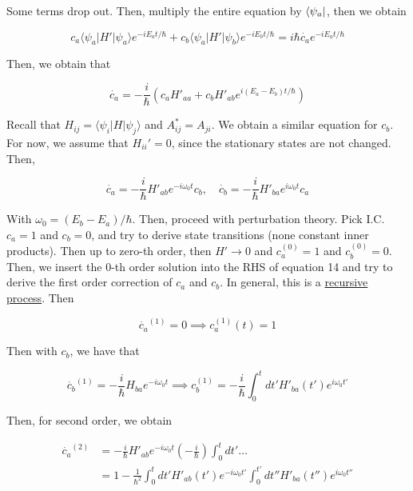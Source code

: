 \documentclass{article}
\newtheorem{one minute paper}[theorem]{One Minute Paper}
\begin{document}
Some terms drop out. Then, multiply the entire equation by $\bra{\psi_a}$, then we obtain 

\begin{equation}
    c_a \langle \psi_a|H'|\psi_a \rangle e^{-iE_at/\hbar} + c_b\langle \psi_a | H' | \psi_b \rangle e^{-iE_bt/\hbar} = i\hbar \dot{c_a}e^{-iE_at/\hbar}
\end{equation}

Then, we obtain that 

\begin{equation}
    \dot{c_a} = -\frac{i}{\hbar}\left( c_a H'_{aa} + c_b H'_{ab}e^{i(E_a - E_b)t/\hbar}\right)
\end{equation}

Recall that $H_{ij} = \langle \psi_i | H | \psi_j \rangle$ and $A^{*}_{ij} = A_{ji}$. We obtain a similar equation for $c_b$. For now, we assume that $H_{ii}' = 0$, since the stationary states are not changed. Then, 

\begin{equation}
    \dot{c_a} = -\frac{i}{\hbar}H'_{ab}e^{-i\omega_0 t}c_b, \quad \dot{c_b} = -\frac{i}{\hbar}H'_{ba}e^{i\omega_0 t}c_a
\end{equation}

With $\omega_0 = (E_b - E_a)/\hbar$. Then, proceed with perturbation theory. Pick I.C. $c_a = 1$ and $c_b = 0$, and try to derive state transitions (none constant inner products). Then up to zero-th order, then 
$H' \rightarrow 0$ and $c_a^{(0)} = 1$ and $c_b^{(0)} = 0$. Then, we insert the 0-th order solution into the RHS of equation 14 and try to derive the first order correction of $c_a$ and $c_b$. In general, this is a \underline{recursive process}. Then 

\begin{equation}
    \dot{c_a}^{(1)} = 0 \implies c_a^{(1)}(t) =1
\end{equation}

Then with $c_b$, we have that 

\begin{equation}
    \dot{c_b}^{(1)} = -\frac{i}{\hbar}H_{ba}e^{-i\omega_0 t} \implies c_b^{(1)} = -\frac{i}{\hbar} \int_{0}^{t}dt'H'_{ba}(t')e^{i\omega_0 t'}
\end{equation}

Then, for second order, we obtain 

\begin{align}
    \dot{c_a}^{(2)} &= -\frac{i}{\hbar}H'_{ab}e^{-i\omega_0 t}\left( -\frac{i}{\hbar} \right)\int_{0}^{t}dt' \dots \\
    &= 1 - \frac{1}{\hbar^2}\int_{0}^{t}dt' H'_{ab}(t')e^{-i\omega_0 t'}\int_{0}^{t'}dt'' H'_{ba}(t'')e^{i\omega_0 t''}
\end{align}
\end{document}
